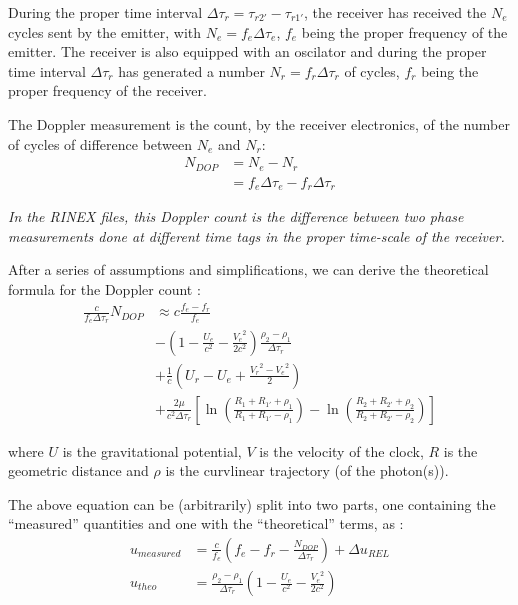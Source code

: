During the proper time interval \(\Delta\tau_{r} = \tau_{r2'} - \tau_{r1'}\), 
the receiver has received the \(N_e\) cycles sent by the emitter, with \(N_e = f_e \Delta\tau_e\), 
\(f_e\) being the proper frequency of the emitter. The receiver is also equipped with
an oscilator and during the proper time interval \(\Delta\tau_{r}\) has generated 
a number \(N_r = f_r \Delta\tau_r\) of cycles, \(f_r\) being the proper frequency of the 
receiver.

The Doppler measurement is the count, by the receiver electronics, of the number 
of cycles of difference between \(N_e\) and \(N_r\):
\begin{equation}
    \begin{split}
    N_{DOP} & = N_e - N_r\\
            & = f_e \Delta\tau_e - f_r \Delta\tau_r
    \end{split}
\end{equation}

\emph{In the RINEX files, this Doppler count is the difference between two phase measurements 
done at different time tags in the proper time-scale of the receiver.}

After a series of assumptions and simplifications, we can derive the theoretical 
formula for the Doppler count \cite{lemoine-2016}:
\begin{equation}
    \begin{split}
        \frac{c}{f_e \Delta\tau_r} N_{DOP} & \approx c \frac{f_e - f_r}{f_e} \\
        & - (1 - \frac{U_e}{c^2} - \frac{{V_e}^2}{2 c^2}) \frac{\rho_2 - \rho_1}{\Delta\tau_r}\\
        & + \frac{1}{c} (U_r - U_e + \frac{{V_r}^2 - {V_e}^2}{2}) \\
        & + \frac{2 \mu}{c^2 \Delta\tau_r} [\ln{(\frac{R_1 + R_{1'} + \rho_1}{R_1 + R_{1'} - \rho_1})} - \ln{(\frac{R_2 + R_{2'} + \rho_2}{R_2 + R_{2'} - \rho_2})}]
    \end{split}
\end{equation}

where \(U\) is the gravitational potential, \(V\) is the velocity of the clock, \(R\) 
is the geometric distance and \(\rho\) is the curvlinear trajectory (of the photon(s)).

The above equation can be (arbitrarily) split into two parts, one containing the ``measured'' 
quantities and one with the ``theoretical'' terms, as \cite{lemoine-2016}:
\begin{subequations}\label{eq:lem12}
  \begin{align}
    u_{measured} & = \frac{c}{f_e} (f_e - f_r -
     \frac{N_{DOP}}{\Delta\tau_r}) + \Delta u_{REL} \label{eq:lem12a} \\
    u_{theo}     &= \frac{\rho_2 - \rho_1}{\Delta\tau_r} (1- \frac{U_e}{c^2} - 
      \frac{{V_e}^2}{2 c^2}) \label{eq:lem12b}
  \end{align}
\end{subequations}


